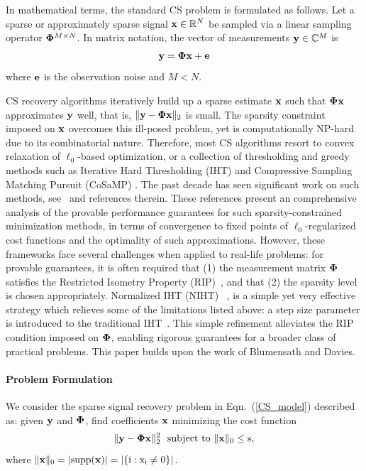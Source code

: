 \documentclass{article}
\begin{document}
In mathematical terms, the standard CS problem is formulated as follows. Let a sparse or approximately sparse signal ${\bf x}\in \mathbb{R}^N$ be sampled via a linear sampling operator ${\bf \Phi}^{M\times N}$. In matrix notation, the vector of measurements ${\bf y} \in \mathbb{C}^M$ is
\begin{equation}\label{CS_model}
 {\bf y} =  {\bf \Phi}  {\bf x} + {\bf e}
\end{equation}
where ${\bf e}$ is the observation noise and $M < N$.

CS recovery algorithms iteratively build up a sparse estimate ${\bf x}$ such that ${\bf \Phi}  {\bf x}$ approximates ${\bf y}$ well, that is,  $\| {\bf y}- {\bf \Phi}  {\bf x} \|_2$ is small. The sparsity constraint imposed on ${\bf x}$ overcomes this ill-posed problem, yet is computationally NP-hard due to its combinatorial nature. 
Therefore, most CS algorithms resort to convex relaxation of $\ell_0$-based optimization, or a collection of thresholding and greedy methods such as Iterative Hard Thresholding (IHT) \cite{blumensath2008iht, blumensath2009iht} and Compressive Sampling Matching Pursuit (CoSaMP) \cite{needel2008cosamp}. The past decade has seen significant work on such methods, see~\cite{liu2017dualiht, yuan2014ht, yuan2016htp, blumensath2013cs, needel2008cosamp} and references therein. These references present an comprehensive analysis of the provable performance guarantees for such sparsity-constrained minimization methods, in terms of convergence to fixed points of $\ell_0$-regularized cost functions and the optimality of such approximations. However, these frameworks face several challenges when applied to real-life problems: for provable guarantees, it is often required that (1) the measurement matrix ${\bf \Phi}$ satisfies the Restricted Isometry Property (RIP)~\cite{candes2008rip, chartrand2008rip}, and that (2) the sparsity level is chosen appropriately. 
Normalized IHT (NIHT)~ \cite{blumensath2010niht}, is a simple yet very effective strategy  which relieves some of the limitations listed above: a step size parameter is introduced to the traditional IHT~\cite{blumensath2008iht}. This simple refinement alleviates the RIP condition imposed on ${\bf \Phi}$, enabling rigorous guarantees for a broader class of practical problems. {This paper
builds upon the work of Blumensath and Davies.}

\paragraph*{Problem Formulation}
 We consider the sparse signal recovery problem in Eqn.~(\ref{CS_model}) described as: given ${\bf y}$ and ${\bf \Phi}$, find coefficients ${\bf x}$ minimizing the cost function
 \begin{equation}\label{cost_function}
     \|{\bf y} - {\bf \Phi x} \|_2^2 \ \ \rm{subject \ to \ \|{\bf x} \|_0 \leq s},
 \end{equation}
 where $\|{\bf x} \|_0 = |\rm{supp}({\bf x})| = |\{i: x_i\neq 0 \}|$.
 
\end{document}
